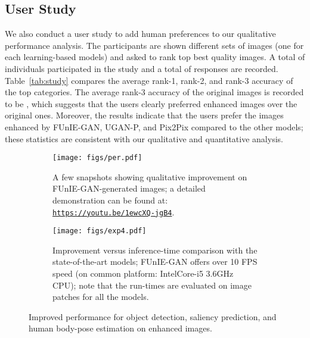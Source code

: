 \documentclass[10pt,twocolumn,letterpaper]{article}
\begin{document}
\subsection{User Study}
We also conduct a user study to add human preferences to our qualitative performance analysis. The participants are shown different sets of  images (one for each learning-based models) and asked to rank top  best quality images. A total of  individuals participated in the study and a total of  responses are recorded. Table~\ref{tab:study} compares the average rank-1, rank-2, and rank-3 accuracy of the top  categories. The average rank-3 accuracy of the original images is recorded to be , which suggests that the users clearly preferred enhanced images over the original ones. Moreover, the results indicate that the users prefer the images enhanced by FUnIE-GAN, UGAN-P, and Pix2Pix compared to the other models; these statistics are consistent with our qualitative and quantitative analysis.   



\begin{figure}[t]
    \centering
    \begin{subfigure}{0.49\textwidth}
    \centering
        \texttt{[image: figs/per.pdf]} 
        \vspace{-1mm}
        \caption{A few snapshots showing qualitative improvement on FUnIE-GAN-generated images; a detailed demonstration can be found at: {\tt \url{https://youtu.be/1ewcXQ-jgB4}}.}
    \label{fig:per_a}
    \end{subfigure}

   \vspace{2mm}
    \begin{subfigure}{0.49\textwidth}
       \centering
        \texttt{[image: figs/exp4.pdf]}
    \vspace{-1mm}
    \caption{Improvement versus inference-time comparison with the state-of-the-art models; FUnIE-GAN offers over 10 FPS speed (on common platform: Intel\texttrademark Core-i5 3.6GHz CPU); note that the run-times are evaluated on  image patches for all the models.}
    \label{fig:per_b}
    \end{subfigure}
    \caption{Improved performance for object detection, saliency prediction, and human body-pose estimation on enhanced images.}
\label{fig:per}
\end{figure}
\end{document}
